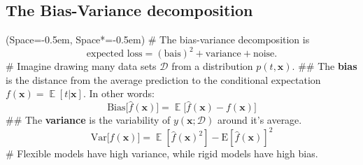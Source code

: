 \documentclass[12pt, a4paper]{article}
\newcommand{\listSpace}{-0.5em}%
\newcommand{\D}{\mathcal{D}}
\newcommand{\vect}[1]{\bm{#1}}
\DeclareMathOperator{\E}{\mathbb{E}}
\begin{document}
\subsection*{The Bias-Variance decomposition}
\begin{easylist}[itemize]
	\ListProperties(Space=\listSpace, Space*=\listSpace)
	# The bias-variance decomposition is
	\begin{equation*}
	\text{expected loss} = (\text{bais})^2 + \text{variance} + \text{noise}.
	\end{equation*}
	# Imagine drawing many data sets $\D$ from a distribution $p(t, \vect{x})$.
	## The \textbf{bias} is the distance from the average prediction to the conditional expectation $f(\vect{x}) = \E \left[t | \vect{x} \right]$.
	In other words:
	\begin{equation*}
		\mathrm{Bias}\big[\hat{f}(\vect{x})\big] = \E \big[\hat{f}(\vect{x}) - f(\vect{x})\big]
	\end{equation*}
	## The \textbf{variance} is the variability of $y(\vect{x}; \D)$ around it's average.
	\begin{equation*}
		\mathrm{Var}\big[\hat{f}(\vect{x})\big] = \E [\hat{f}(\vect{x})^2] - \mathrm{E}[{\hat{f}}(\vect{x})]^2
	\end{equation*}
	# Flexible models have high variance, while rigid models have high bias.
\end{easylist}
\end{document}
